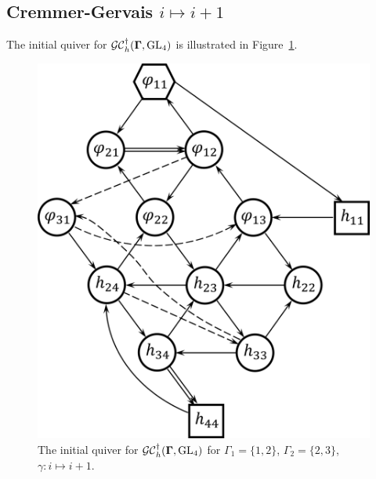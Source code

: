  \subsection{Cremmer-Gervais $i \mapsto i+1$}
The initial quiver for $\mathcal{GC}_h^{\dagger}(\mathbf{\Gamma},\operatorname{GL}_4)$ is illustrated in Figure~\ref{f:n=4_CG_i-i+1}.

\begin{figure}[htb]
\begin{center}
\includegraphics[scale=0.65]{h_convention/h_n=4_CG_i-i+1.png}
\end{center}
\caption{The initial quiver for $\mathcal{GC}^{\dagger}_h(\mathbf{\Gamma},\operatorname{GL}_4)$ for $\Gamma_1 = \{1,2\}$, $\Gamma_2 = \{2,3\}$, $\gamma:i \mapsto i+1$.}
\label{f:n=4_CG_i-i+1}
\end{figure}
 
